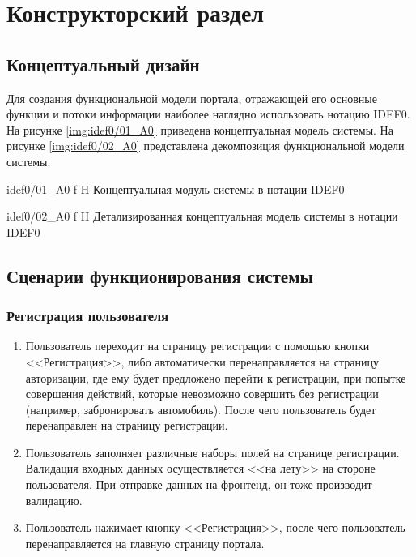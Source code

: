 \chapter{Конструкторский раздел}

\section{Концептуальный дизайн}

Для создания функциональной модели портала, отражающей его основные функции и потоки информации наиболее наглядно использовать нотацию
IDEF0. На рисунке \ref{img:idef0/01_A0} приведена концептуальная модель системы. На рисунке \ref{img:idef0/02_A0} представлена декомпозиция функциональной модели системы.

{idef0/01_A0}
{f}
{H}
{\textwidth}
{Концептуальная модуль системы в нотации IDEF0}

{idef0/02_A0}
{f}
{H}
{\textwidth}
{Детализированная концептуальная модель системы в нотации IDEF0}

\section{Сценарии функционирования системы}

\subsection*{Регистрация пользователя}

\begin{enumerate}
	\item Пользователь переходит на страницу регистрации с помощью кнопки <<Регистрация>>, либо автоматически перенаправляется на страницу авторизации, где ему будет предложено перейти к регистрации, при попытке совершения действий, которые невозможно совершить без регистрации (например, забронировать автомобиль). После чего пользователь будет перенаправлен на страницу регистрации.
	
	\item Пользователь заполняет различные наборы полей на странице регистрации. Валидация входных данных осуществляется <<на лету>> на стороне пользователя. При отправке данных на фронтенд, он тоже производит валидацию.
	
	\item Пользователь нажимает кнопку <<Регистрация>>, после чего пользователь перенаправляется на главную страницу портала.
\end{enumerate}

